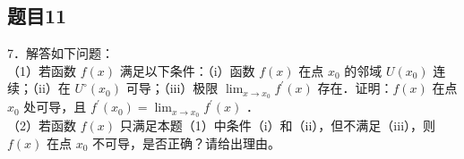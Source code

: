 \documentclass{article}
\begin{document}
\subsection{题目11}
7．解答如下问题：\\
（1）若函数 \(f(x)\) 满足以下条件：（i）函数 \(f(x)\) 在点 \(x_{0}\) 的邻域 \(U\left(x_{0}\right)\) 连续；（ii）在 \(U^{\circ}\left(x_{0}\right)\) 可导；（iii）极限 \(\lim _{x \rightarrow x_{0}} f^{\prime}(x)\) 存在．证明：\(f(x)\) 在点 \(x_{0}\) 处可导，且 \(f^{\prime}\left(x_{0}\right)=\lim _{x \rightarrow x_{0}} f^{\prime}(x)\) ．\\
（2）若函数 \(f(x)\) 只满足本题（1）中条件（i）和（ii），但不满足（iii），则 \(f(x)\) 在点 \(x_{0}\) 不可导，是否正确？请给出理由。
\end{document}
